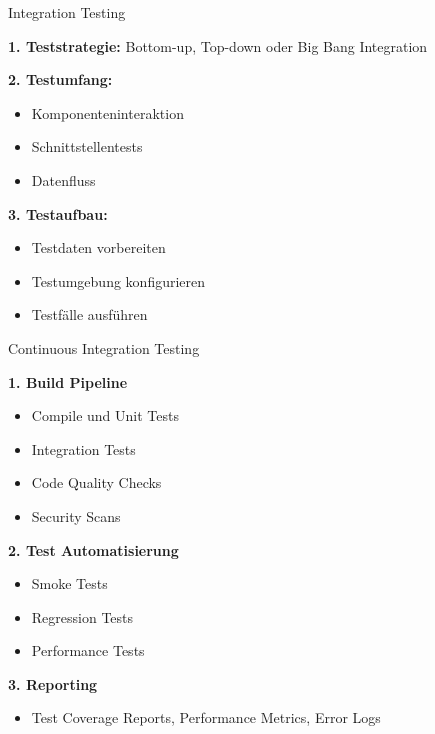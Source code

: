 \begin{KR}{Integration Testing}

\textbf{1. Teststrategie:} Bottom-up, Top-down oder Big Bang Integration

\begin{minipage}[t]{0.5\textwidth}
\textbf{2. Testumfang:}
\begin{itemize}
   \item Komponenteninteraktion
   \item Schnittstellentests
   \item Datenfluss
\end{itemize}
\end{minipage}
\begin{minipage}[t]{0.5\textwidth}
\textbf{3. Testaufbau:}
\begin{itemize}
   \item Testdaten vorbereiten
   \item Testumgebung konfigurieren
   \item Testfälle ausführen
\end{itemize}
\end{minipage}
\end{KR}



\begin{KR}{Continuous Integration Testing}

\begin{minipage}[t]{0.5\textwidth}
\textbf{1. Build Pipeline}
\begin{itemize}
   \item Compile und Unit Tests
   \item Integration Tests
   \item Code Quality Checks
   \item Security Scans
\end{itemize}
\end{minipage}
\begin{minipage}[t]{0.5\textwidth}
\textbf{2. Test Automatisierung}
\begin{itemize}
   \item Smoke Tests
   \item Regression Tests
   \item Performance Tests
\end{itemize}
\end{minipage}

\textbf{3. Reporting}
\begin{itemize}
   \item Test Coverage Reports, Performance Metrics, Error Logs
\end{itemize}
\end{KR}



